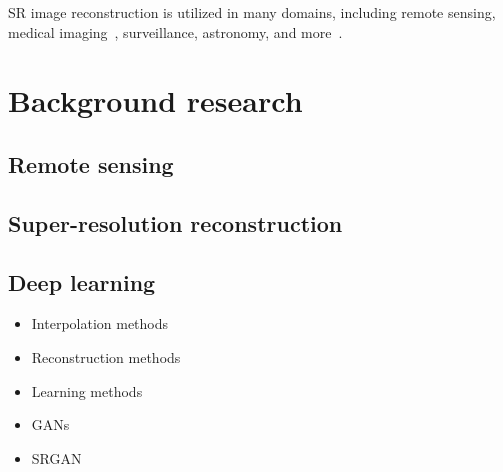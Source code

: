 SR image reconstruction is utilized in many domains, including remote sensing, medical imaging~\cite{superResMedicalImaging}, surveillance, astronomy, and more~\cite{superResUses}.

\section{Background research}

\subsection{Remote sensing}

\subsection{Super-resolution reconstruction}

\subsection{Deep learning}



\begin{itemize}
    \item Interpolation methods
    \item Reconstruction methods
    \item Learning methods
    \item GANs
    \item SRGAN
\end{itemize}